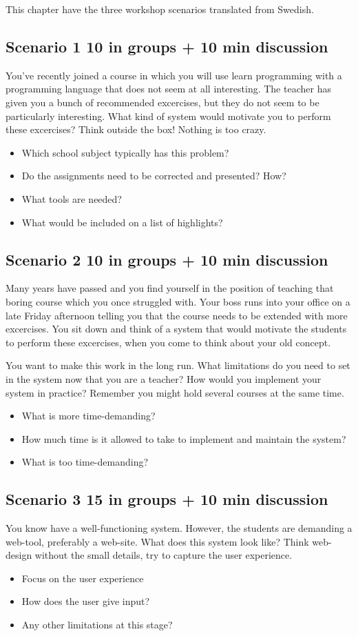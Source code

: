 This chapter have the three workshop scenarios translated from Swedish.

\subsection{Scenario 1 10 in groups + 10 min discussion}
You've recently joined a course in which you will use learn programming with a programming language that does not seem at all interesting. The teacher has given you a bunch of recommended excercises, but they do not seem to be particularly interesting. What kind of system would motivate you to perform these excercises? Think outside the box! Nothing is too crazy.

\begin{itemize}
\item Which school subject typically has this problem?
\item Do the assignments need to be corrected and presented? How?
\item What tools are needed?
\item What would be included on a list of highlights?
\end{itemize}

\subsection{Scenario 2 10 in groups + 10 min discussion}
Many years have passed and you find yourself in the position of teaching that boring course which you once struggled with. Your boss runs into your office on a late Friday afternoon telling you that the course needs to be extended with more excercises. You sit down and think of a system that would motivate the students to perform these excercises, when you come to think about your old concept.

You want to make this work in the long run. What limitations do you need to set in the system now that you are a teacher? How would you implement your system in practice? Remember you might hold several courses at the same time.

\begin{itemize}
\item What is more time-demanding?
\item How much time is it allowed to take to implement and maintain the system?
\item What is too time-demanding?
\end{itemize}

\subsection{Scenario 3 15 in groups + 10 min discussion}
You know have a well-functioning system. However, the students are demanding a web-tool, preferably a web-site. What does this system look like? Think web-design without the small details, try to capture the user experience.

\begin{itemize}
\item Focus on the user experience
\item How does the user give input?
\item Any other limitations at this stage?
\end{itemize}
